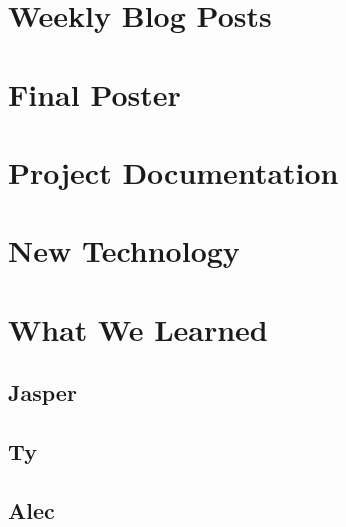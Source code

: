 \documentclass[10pt,draftclsnofoot,onecolumn]{IEEEtran}
\begin{document}
\newpage
\section{Weekly Blog Posts} %


\newpage
\section{Final Poster} %

\newpage
\section{Project Documentation} %


\newpage
\section{New Technology} %


\newpage
\section{What We Learned} %
\subsection{Jasper}


\subsection{Ty}


\subsection{Alec}

\end{document}
